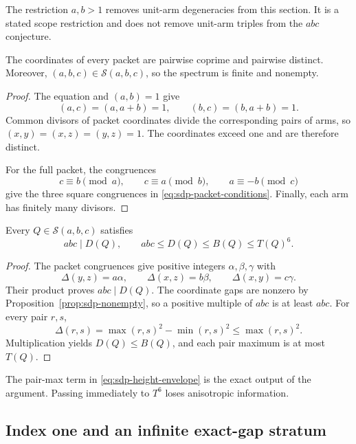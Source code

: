 The restriction $a,b>1$ removes unit-arm degeneracies from this section.
It is a stated scope restriction and does not remove unit-arm triples from
the $abc$ conjecture.

\begin{proposition}
\label{prop:sdp-nonempty}
The coordinates of every packet are pairwise coprime and pairwise distinct.
Moreover, $(a,b,c)\in\mathcal S(a,b,c)$, so the spectrum is finite and
nonempty.
\end{proposition}

\begin{proof}
The equation and $(a,b)=1$ give
\[
 (a,c)=(a,a+b)=1,
 \qquad
 (b,c)=(b,a+b)=1.
\]
Common divisors of packet coordinates divide the corresponding pairs of
arms, so $(x,y)=(x,z)=(y,z)=1$.  The coordinates exceed one and are therefore
distinct.

For the full packet, the congruences
\[
 c\equiv b\pmod a,
 \qquad c\equiv a\pmod b,
 \qquad a\equiv-b\pmod c
\]
give the three square congruences in
\eqref{eq:sdp-packet-conditions}.  Finally, each arm has finitely many
divisors.
\end{proof}

\begin{theorem}
\label{thm:sdp-height-envelope}
Every $Q\in\mathcal S(a,b,c)$ satisfies
\begin{equation}
 abc\mid D(Q),
 \qquad
 abc\le D(Q)\le B(Q)\le T(Q)^6.
 \label{eq:sdp-height-envelope}
\end{equation}
\end{theorem}

\begin{proof}
The packet congruences give positive integers $\alpha,\beta,\gamma$ with
\[
 \Delta(y,z)=a\alpha,
 \qquad
 \Delta(x,z)=b\beta,
 \qquad
 \Delta(x,y)=c\gamma.
\]
Their product proves $abc\mid D(Q)$.  The coordinate gaps are nonzero by
Proposition~\ref{prop:sdp-nonempty}, so a positive multiple of $abc$ is at
least $abc$.  For every pair $r,s$,
\[
 \Delta(r,s)=\max(r,s)^2-\min(r,s)^2\le\max(r,s)^2.
\]
Multiplication yields $D(Q)\le B(Q)$, and each pair maximum is at most
$T(Q)$.
\end{proof}

The pair-max term in \eqref{eq:sdp-height-envelope} is the exact output of
the argument.  Passing immediately to $T^6$ loses anisotropic information.

\subsection{Index one and an infinite exact-gap stratum}

